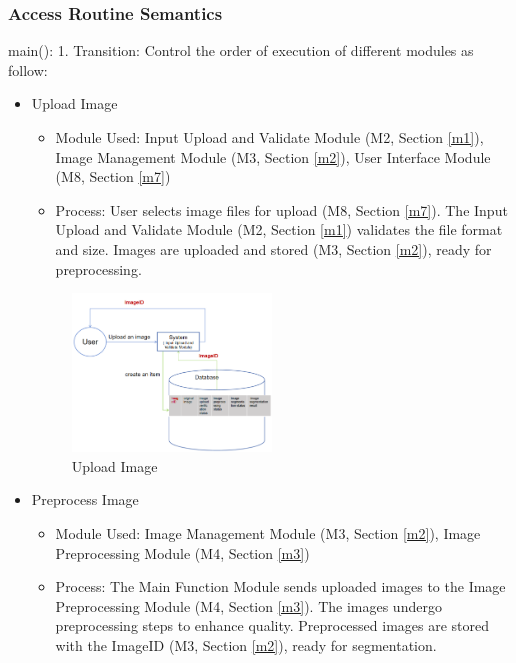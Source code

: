 \documentclass[12pt, titlepage]{article}
\begin{document}
\subsubsection{Access Routine Semantics}

\noindent main():
1. Transition: Control the order of execution of different modules as follow:
\begin{itemize}
\item Upload Image
    \begin{itemize}
        \item  Module Used:  Input Upload and Validate  Module (M2, Section \ref{m1}), Image Management Module (M3, Section \ref{m2}), User Interface Module (M8, Section \ref{m7})
        \item Process: User selects image files for upload (M8, Section \ref{m7}). The  Input Upload and Validate  Module (M2, Section \ref{m1}) validates the file format and size. Images are uploaded and stored (M3, Section \ref{m2}), ready for preprocessing.
    \end{itemize}

    \begin{figure}[H]
    \centering
    \includegraphics[width=0.5\textwidth]{upload.png}
    \caption{Upload Image}
    \label{Fig5}
    \end{figure}
\item Preprocess Image
    \begin{itemize}
        \item  Module Used: Image Management Module (M3, Section \ref{m2}), Image Preprocessing Module (M4, Section \ref{m3})
        \item Process: The Main Function Module sends uploaded images to the Image Preprocessing Module (M4, Section \ref{m3}). The images undergo preprocessing steps to enhance quality. Preprocessed images are stored with the ImageID  (M3, Section \ref{m2}), ready for segmentation.
    \end{itemize}
    

\end{itemize}
\end{document}
